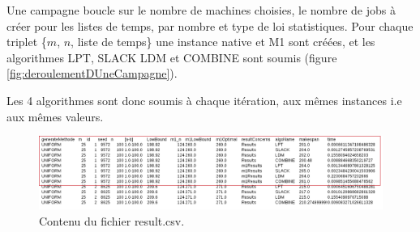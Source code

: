\documentclass[a4paper,12pt]{report}
\theoremstyle{plain}				%
\theoremstyle{definition}				%
\begin{document}
Une campagne boucle sur le nombre de machines choisies, le nombre de jobs à créer pour les listes de temps, par nombre et type de loi statistiques. Pour chaque triplet \{$m$, $n$, liste de temps\} une instance native et M1 sont créées, et les algorithmes LPT, SLACK LDM et COMBINE sont soumis (figure \ref{fig:deroulementDUneCampagne}).

Les 4 algorithmes sont donc soumis à chaque itération, aux mêmes instances i.e aux mêmes valeurs. 

\begin{figure}
{\centering
\includegraphics[width=\columnwidth]{contenuResultCSV.png}
\caption{Contenu du fichier result.csv.}
\label{fig:contenuResultCSV}
\par}
\end{figure}
\end{document}
